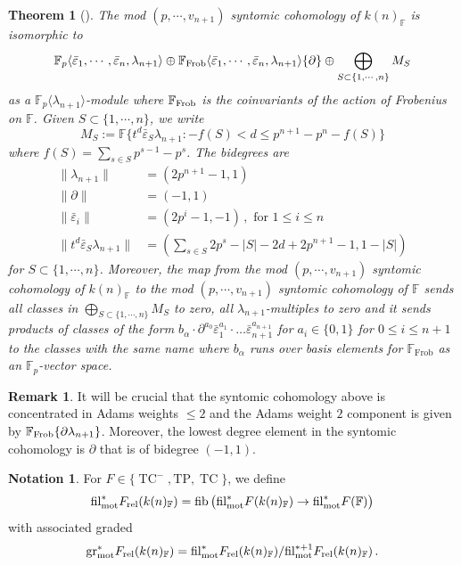 \documentclass[english,10pt]{amsart}
\DeclareMathOperator{\fib}{fib}
\newcommand{\field}{\mathbb{F}}
\newtheorem{thm}{Theorem}[section]
\theoremstyle{definition}
\newtheorem{nota}{Notation}[section]
\newtheorem{rema}{Remark}[section]
\numberwithin{equation}{section}
\newcommand{\mot}{\textup{mot}}
\DeclareMathOperator{\TC}{TC}
\newcommand{\fil}{\mathrm{fil}}
\newcommand{\TP}{\mathrm{TP}}
\newcommand{\grmot}{\mathrm{gr}_{\textup{mot}}^*}
\begin{document}
\begin{thm}[{\cite[Theorem~3.5.7,~Theorem~4.5.3]{angelini2024syntomic}}]\label{AKHW}
The mod $(p,\cdots ,v_{n+1})$ syntomic cohomology of $k(n)_{\field}$  is isomorphic to
\begin{align}\label{eq: syntomic}
\mathbb{F}_p\langle \bar{\varepsilon}_{1},\cdots,  \bar{\varepsilon}_{n} , \lambda_{n+1} \rangle \oplus \field_{\textup{Frob}}\langle \bar{\varepsilon}_{1},\cdots,  \bar{\varepsilon}_{n} , \lambda_{n+1} \rangle\{\partial\}\oplus  \bigoplus_{S\subset \{1,\cdots,n\}}M_S
\end{align}
as a $\mathbb{F}_p\langle \lambda_{n+1} \rangle$-module where $\field_{\textup{Frob}}$ is the coinvariants of the action of Frobenius on $\field$. Given $S\subset \{1,\cdots ,n\}$, we write 
\[ 
M_{S}:=
	\field\{t^d\bar{\varepsilon}_S\lambda_{n+1} : -f(S) < d\le p^{n+1}-p^n-f(S)\}
\]
where $f(S)=\sum_{s\in S} p^{s-1}-p^s$. 
The bidegrees are 
\begin{align*}
\|\lambda_{n+1}\|& =(2p^{n+1}-1,1)\\
\| \partial \| & = (-1,1)  \\
\| \bar{\varepsilon}_i\| & = (2p^i-1,-1)  \,, \text{ for } 1\le i \le n \\
\|t^d\bar{\varepsilon}_S\lambda_{n+1}\| & =(\sum_{s\in S}2p^s-|S|-2d+2p^{n+1}-1,1-|S|) 
\end{align*}
for $S\subset \{1,\cdots ,n\}$. Moreover, the map from the mod $(p,\cdots ,v_{n+1})$ syntomic cohomology of $k(n)_{\field}$ to the  mod $(p,\cdots ,v_{n+1})$ syntomic cohomology of $\field$ sends all classes in $\bigoplus_{S\subset \{1,\cdots,n\}}M_S$ to zero, all $\lambda_{n+1}$-multiples to zero and it sends products of classes of the form $b_\alpha \cdot \partial^{a_0}\bar{\varepsilon}_{1}^{a_1}\cdot \dots \bar{\varepsilon}_{n+1}^{a_{n+1}}$ for $a_i\in \{0,1\}$ for $0\le i\le n+1$ to the classes with the same name where $b_{\alpha}$ runs over basis elements for $\field_{\mathrm{Frob}}$ as an $\mathbb{F}_p$-vector space.
\end{thm}


\begin{rema}
It will be crucial that the syntomic cohomology above is concentrated in Adams weights $\leq 2$ and the Adams weight $2$ component is given by $\field_{\textup{Frob}}\{\partial\lambda_{n+1}\}$. Moreover, the lowest degree element in the syntomic cohomology is $\partial$ that is of bidegree $(-1,1)$.
\end{rema}

\begin{nota}
For $F\in \{\TC^{-},\TP,\TC\}$, we define 
\[ \fil_{\mot}^* F_{\textup{rel}}(k(n)_{\field})=\fib  \big ( \fil_{\mot}^*F(k(n)_{\field})\to  \fil_{\mot}^*F({\field}) \big )
\]
with associated graded 
\[ \grmot F_{\textup{rel}}(k(n)_{\field})=\fil_{\mot}^* F_{\textup{rel}}(k(n)_{\field})/\fil_{\mot}^{*+1} F_{\textup{rel}}(k(n)_{\field})\,.
\]
\end{nota}
\end{document}
